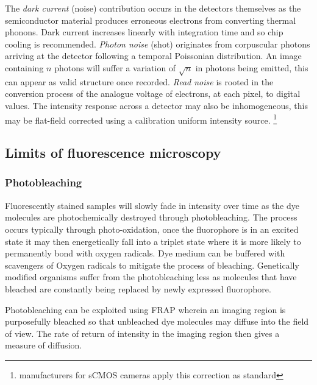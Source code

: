 The \emph{dark current} (noise) contribution occurs in the detectors themselves as the semiconductor material produces erroneous electrons from converting thermal phonons.
Dark current increases linearly with integration time and so chip cooling is recommended.
\emph{Photon noise} (shot) originates from corpuscular photons arriving at the detector following a temporal Poissonian distribution.
An image containing $n$ photons will suffer a variation of $\sqrt{n}$ in photons being emitted, this can appear as valid structure once recorded.
\emph{Read noise} is rooted in the conversion process of the analogue voltage of electrons, at each pixel, to digital values.
The intensity response across a detector may also be inhomogeneous, this may be flat-field corrected using a calibration uniform intensity source.
\footnote{manufacturers for sCMOS cameras apply this correction as standard}


\subsection{Limits of fluorescence microscopy}

\subsubsection{Photobleaching}

Fluorescently stained samples will slowly fade in intensity over time as the dye molecules are photochemically destroyed through photobleaching.
The process occurs typically through photo-oxidation, once the fluorophore is in an excited state it may then energetically fall into a triplet state where it is more likely to permanently bond with oxygen radicals.
Dye medium can be buffered with scavengers of Oxygen radicals to mitigate the process of bleaching.
Genetically modified organisms suffer from the photobleaching less as molecules that have bleached are constantly being replaced by newly expressed fluorophore.

Photobleaching can be exploited using FRAP wherein an imaging region is purposefully bleached so that unbleached dye molecules may diffuse into the field of view.
The rate of return of intensity in the imaging region then gives a measure of diffusion.

